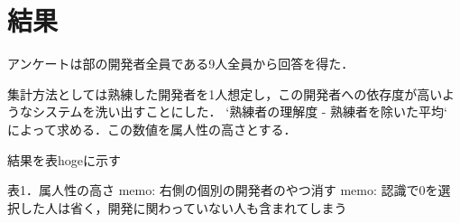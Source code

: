 \section{結果}
アンケートは部の開発者全員である9人全員から回答を得た．

集計方法としては熟練した開発者を1人想定し，この開発者への依存度が高いようなシステムを洗い出すことにした． `熟練者の理解度 - 熟練者を除いた平均` によって求める．この数値を属人性の高さとする．

結果を表hogeに示す

表1．属人性の高さ
memo: 右側の個別の開発者のやつ消す
memo: 認識で0を選択した人は省く，開発に関わっていない人も含まれてしまう

